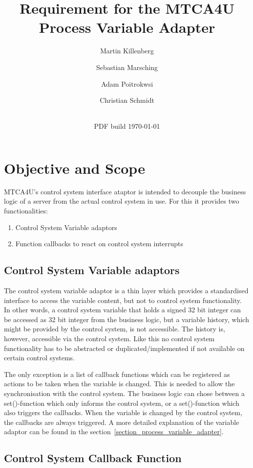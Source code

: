 \documentclass[11pt,a4paper]{scrartcl}
\title{Requirement for the MTCA4U Process Variable Adapter}
\date{\svnrevision\\ PDF build \today}
\author[1]{Martin Killenberg} \author[2]{Sebastian Marsching}
\author[3]{Adam Poitrokwsi}
\author[1]{Christian Schmidt}
\affil[1]{Deutsches Elektronen-Synchrotron DESY, Hamburg, Germany}
\affil[2]{aquenos GmbH, Baden-Baden, Germany}
\affil[3]{FastLogic Sp.\ z o.\ o., \L\'od\'z, Poland}
\begin{document}
\maketitle
\section{Objective and Scope}

MTCA4U's control system interface ataptor is intended to decouple the business logic of a server from the actual control system in use. For this it provides two functionalities:
\begin{enumerate}
  \item Control System Variable adaptors
  \item Function callbacks to react on control system interrupts
\end{enumerate}

\subsection{Control System Variable adaptors}

The control system variable adaptor is a thin layer which provides a standardised interface to access the variable content, but not to control system functionality. In other words, a control system variable that holds a signed 32 bit integer can be accessed as 32 bit integer from the business logic, but a variable history, which might be provided by the control system, is not accessible. The history is, however, accessible via the control system. Like this no control system functionality has to be abstracted or duplicated/implemented if not available on certain control systems.

The only exception is a list of callback functions which can be registered as actions to be taken when the variable is changed. This is needed to allow the synchronisation with the control system. The business logic can chose between a set()-function which only informs the control system, or a set()-function which also triggers the callbacks. When the variable is changed by the control system, the callbacks are always triggered. A more detailed explanation of the variable adaptor can be found in the section~\ref{section_process_variable_adapter}.

\subsection{Control System Callback Function}
\end{document}
